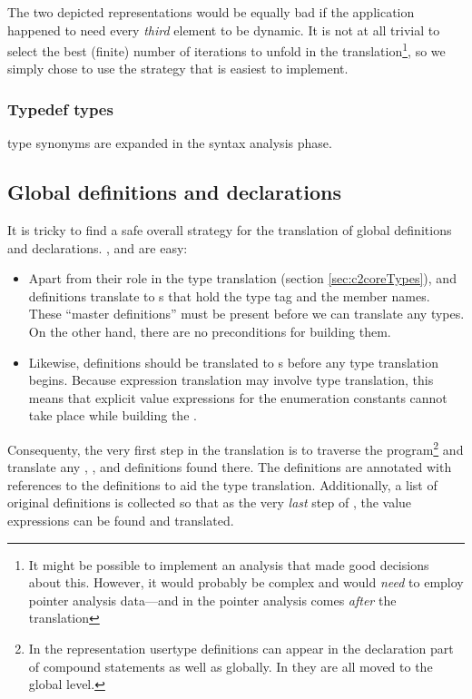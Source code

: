 \begin{docpart}
The two depicted representations would be equally bad if the
application happened to need every \emph{third} element to
be dynamic. It is not at all trivial to select the best (finite)
number of iterations to unfold in the translation\footnote
        {It might be possible to implement an analysis that
        made good decisions about this. However, it would
        probably be complex and would \emph{need} to employ
        pointer analysis data---and in \cmix the pointer analysis
        comes \emph{after} the \ctoc translation},
so we simply chose to use the strategy that is easiest to implement.

\subsubsection{Typedef types}
 type synonyms are expanded in the syntax analysis phase.

\subsection{Global definitions and declarations}
\label{sec:c2coreGlobally}
It is tricky to find a safe overall strategy for the translation
of global definitions and declarations. ,
 and  are easy:
\begin{itemize}
\item Apart from their role in the type translation (section
      \ref{sec:c2coreTypes}),  and 
      definitions translate to s that hold
      the type tag and the member names. These ``master definitions''
      must be present before we can translate any types. On the other
      hand, there are no preconditions for building them.
\item Likewise,  definitions should be translated
      to s before any type translation begins.
      Because expression translation may involve type translation,
      this means that explicit value expressions for the enumeration
      constants cannot take place while building the
      .
\end{itemize}
Consequenty, the very first step in the \ctoc translation is to
traverse the \ansiC program\footnote
        {In the \ansiC representation usertype definitions can
        appear in the declaration part of compound statements
        as well as globally. In \coreC they are all moved to
        the global level.}
and translate any , , and 
definitions found there. The \ansiC definitions are annotated with
references to the \coreC definitions to aid the type translation.
Additionally, a list of original  definitions is
collected so that as the very \emph{last} step of \ctoc, the
value expressions can be found and translated.


\end{docpart}

